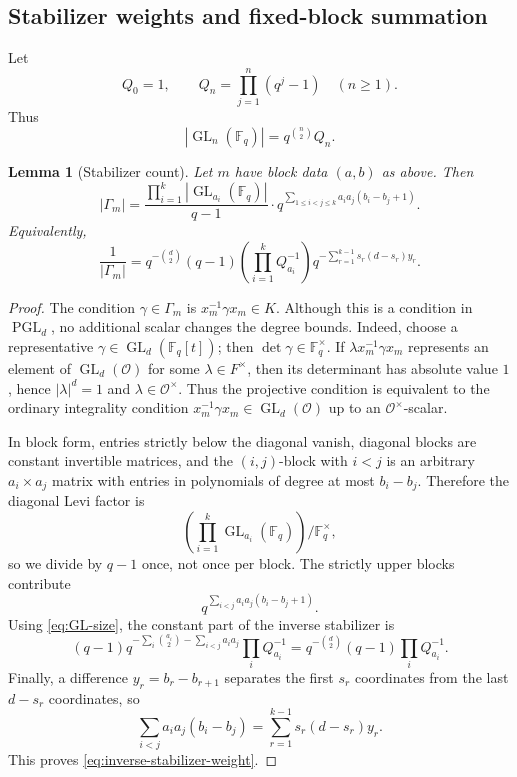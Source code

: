\documentclass[11pt]{amsart}
\newcommand{\Fq}{\mathbb F_q}
\newcommand{\OO}{\mathcal O}
\newcommand{\GL}{\operatorname{GL}}
\newcommand{\PGL}{\operatorname{PGL}}
\theoremstyle{plain}
\newtheorem{lemma}[theorem]{Lemma}
\theoremstyle{definition}
\numberwithin{equation}{section}
\begin{document}
\subsection{Stabilizer weights and fixed-block summation}

Let
\begin{equation}\label{eq:Qn}
  Q_0=1,
  \qquad
  Q_n=\prod_{j=1}^n(q^j-1)\quad (n\ge1).
\end{equation}
Thus
\begin{equation}\label{eq:GL-size}
  |\GL_n(\Fq)|=q^{\binom n2}Q_n.
\end{equation}

\begin{lemma}[Stabilizer count]\label{lem:stabilizer}
Let $m$ have block data $(a,b)$ as above.  Then
\[
  |\Gamma_m|
  =
  \frac{\prod_{i=1}^k |\GL_{a_i}(\Fq)|}{q-1}
  \cdot
  q^{\sum_{1\le i<j\le k}a_ia_j(b_i-b_j+1)}.
\]
Equivalently,
\begin{equation}\label{eq:inverse-stabilizer-weight}
  \frac1{|\Gamma_m|}
  =
  q^{-\binom d2}(q-1)
  \left(\prod_{i=1}^k Q_{a_i}^{-1}\right)
  q^{-\sum_{r=1}^{k-1}s_r(d-s_r)y_r}.
\end{equation}
\end{lemma}

\begin{proof}
The condition $\gamma\in\Gamma_m$ is $x_m^{-1}\gamma x_m\in K$.  Although this is a
condition in $\PGL_d$, no additional scalar changes the degree bounds.  Indeed, choose a
representative $\gamma\in\GL_d(\Fq[t])$; then $\det\gamma\in\Fq^\times$.  If
$\lambda x_m^{-1}\gamma x_m$ represents an element of $\GL_d(\OO)$ for some
$\lambda\in F^\times$, then its determinant has absolute value $1$, hence
$|\lambda|^d=1$ and $\lambda\in\OO^\times$.  Thus the projective condition is
equivalent to the ordinary integrality condition $x_m^{-1}\gamma x_m\in\GL_d(\OO)$
up to an $\OO^\times$-scalar.

In block form, entries strictly below the diagonal vanish, diagonal blocks are constant
invertible matrices, and the $(i,j)$-block with $i<j$ is an arbitrary $a_i\times a_j$
matrix with entries in polynomials of degree at most $b_i-b_j$.  Therefore the diagonal
Levi factor is
\[
  \left(\prod_{i=1}^k\GL_{a_i}(\Fq)\right)/\Fq^\times,
\]
so we divide by $q-1$ once, not once per block.  The strictly upper blocks contribute
\[
  q^{\sum_{i<j}a_ia_j(b_i-b_j+1)}.
\]
Using \eqref{eq:GL-size}, the constant part of the inverse stabilizer is
\[
  (q-1)q^{-\sum_i\binom{a_i}{2}-\sum_{i<j}a_ia_j}
  \prod_iQ_{a_i}^{-1}
  =q^{-\binom d2}(q-1)\prod_iQ_{a_i}^{-1}.
\]
Finally, a difference $y_r=b_r-b_{r+1}$ separates the first $s_r$ coordinates from the last
$d-s_r$ coordinates, so
\[
  \sum_{i<j}a_ia_j(b_i-b_j)
  =\sum_{r=1}^{k-1}s_r(d-s_r)y_r.
\]
This proves \eqref{eq:inverse-stabilizer-weight}.
\end{proof}
\end{document}

